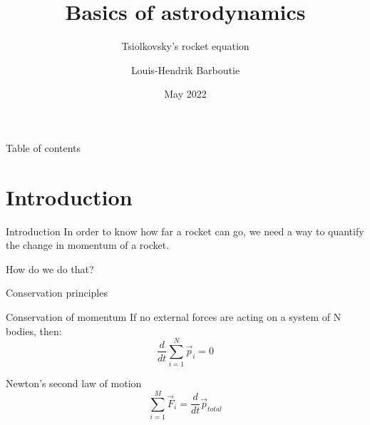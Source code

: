 \documentclass{beamer}
\title{Basics of astrodynamics}
\subtitle{Tsiolkovsky's rocket equation}
\author{Louis-Hendrik Barboutie}
\institute{University of Luxemburg}
\date{May 2022}
\begin{document}
\begin{frame}
    \maketitle
\end{frame}

\begin{frame}{Table of contents}
    \tableofcontents
\end{frame}

\section{Introduction}
\begin{frame}{Introduction}
    In order to know how far a rocket can go, we need a way to quantify the change in momentum of a rocket.\medskip
    \pause
    
    
    How do we do that?
\end{frame} 

\begin{frame}{Conservation principles}
\begin{block}{Conservation of momentum}
    If no external forces are acting on a system of N bodies, then:
    \begin{equation}
        \frac{d}{dt}\sum_{i=1}^N\Vec{p}_i = 0
    \end{equation}
\end{block}
\pause
\begin{exampleblock}{Newton's second law of motion}
\begin{equation}
    \sum_{i=1}^M \Vec{F}_i = \frac{d}{dt} \Vec{p}_{total}
\end{equation}
\end{exampleblock}
    
\end{frame}
\end{document}
